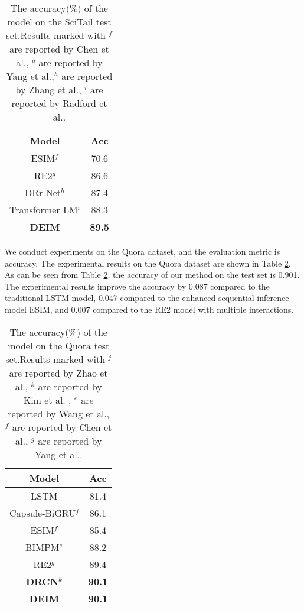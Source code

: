 \documentclass[review]{elsarticle}
\begin{document}
\begin{table}[htbp]
 \centering
  \caption{\label{tab:4}The accuracy($\%$) of the model on the SciTail test  set.Results marked with    $^f$ are reported by Chen et al.\cite{chen2017enhanced}, $^g$ are reported by Yang et al.\cite{yang2019simple},$^h$ are reported by Zhang et al.\cite{zhang2019drr}, $^i$ are reported by Radford et al.\cite{radford2018improving}.}
\begin{tabular}{cc}
 \toprule
Model & Acc\\
 \midrule
ESIM$^f$ & 70.6 \\
RE2$^g$ & 86.6 \\
DRr-Net$^h$ & 87.4 \\
Transformer LM$^i$ & 88.3 \\
\textbf{DEIM} & \textbf{89.5} \\
\bottomrule
 \end{tabular}
\end{table}
We conduct experiments on the Quora dataset, and the evaluation metric is accuracy.
The experimental results on the Quora dataset are shown in Table  \ref{tab:5}. As can be seen from Table \ref{tab:5}, the accuracy of our method on the test set is 0.901. The experimental results improve the accuracy by 0.087 compared to the traditional LSTM model, 0.047 compared to the enhanced sequential inference model ESIM, and 0.007 compared to the RE2 model with multiple interactions. 
\begin{table}[htbp]
 \centering
  \caption{\label{tab:5}The accuracy($\%$) of the model on the Quora test  set.Results marked with    $^j$ are reported by Zhao et al.\cite{zhao2020algorithm}, $^k$ are reported by Kim et al.\cite{kim2019semantic} , $^e$ are reported by Wang et al.\cite{wang2017bilateral},  $^f$ are reported by Chen et al.\cite{chen2017enhanced}, $^g$ are reported by Yang et al.\cite{yang2019simple}.}
\begin{tabular}{cc}
 \toprule
Model & Acc\\
 \midrule
LSTM & 81.4 \\
Capsule-BiGRU$^j$ & 86.1 \\
ESIM$^f$ & 85.4 \\
BIMPM$^e$ & 88.2 \\
RE2$^g$ & 89.4 \\
\textbf{DRCN}$^k$ & \textbf{90.1} \\
\textbf{DEIM} & \textbf{90.1} \\
\bottomrule
 \end{tabular}
\end{table}
\end{document}
